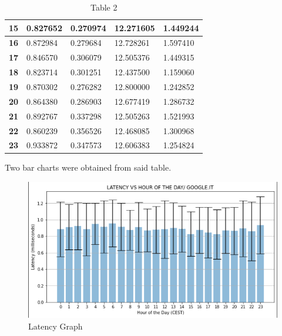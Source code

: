 \documentclass[a4paper,10pt]{article}
\begin{document}
\begin{table}[h!]
\begin{tabular}{|c|l|l|l|l|}
\textbf{15}                & 0.827652    & 0.270974              & 12.271605 & 1.449244       \\ \hline
\textbf{16}                & 0.872984    & 0.279684              & 12.728261 & 1.597410       \\ \hline
\textbf{17}                & 0.846570    & 0.306079              & 12.505376 & 1.449315       \\ \hline
\textbf{18}                & 0.823714    & 0.301251              & 12.437500 & 1.159060       \\ \hline
\textbf{19}                & 0.870302    & 0.276282              & 12.800000 & 1.242852       \\ \hline
\textbf{20}                & 0.864380    & 0.286903              & 12.677419 & 1.286732       \\ \hline
\textbf{21}                & 0.892767    & 0.337298              & 12.505263 & 1.521993       \\ \hline
\textbf{22}                & 0.860239    & 0.356526              & 12.468085 & 1.300968       \\ \hline
\textbf{23}                & 0.933872    & 0.347573              & 12.606383 & 1.254824       \\ \hline
\end{tabular}

\caption{Table 2}
\label{fig:table2}

\end{table}


Two bar charts were obtained from said table.

\clearpage

\begin{figure}[h!]
\centering
\includegraphics[scale=0.4]{latency_graph}
\caption{Latency Graph}
\label{fig:latency_graph}
\end{figure}
\end{document}
